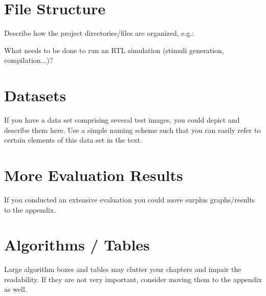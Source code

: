 

\section{File Structure}
Describe how the project directories/files are organized, e.g.:

\begin{flushleft}
\end{flushleft}

What needs to be done to run an RTL simulation (stimuli generation,
compilation...)?


\section{Datasets}
If you have a data set comprising several test images, you could
depict and describe them here. Use a simple naming scheme such that
you can easily refer to certain elements of this data set in the text.


\section{More Evaluation Results}
If you conducted an extensive evaluation you could move surplus
graphs/results to the appendix.


\section{Algorithms / Tables}
Large algorithm boxes and tables may clutter your chapters and impair
the readability. If they are not very important, consider moving them
to the appendix as well.

